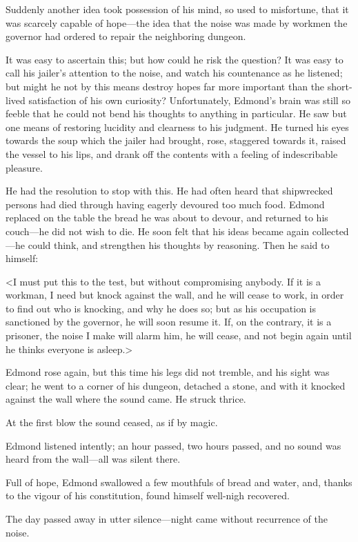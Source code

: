 Suddenly another idea took possession of his mind, so used to misfortune, that it was scarcely capable of hope—the idea that the noise was made by workmen the governor had ordered to repair the neighboring dungeon. 

 It was easy to ascertain this; but how could he risk the question? It was easy to call his jailer's attention to the noise, and watch his countenance as he listened; but might he not by this means destroy hopes far more important than the short-lived satisfaction of his own curiosity? Unfortunately, Edmond's brain was still so feeble that he could not bend his thoughts to anything in particular. He saw but one means of restoring lucidity and clearness to his judgment. He turned his eyes towards the soup which the jailer had brought, rose, staggered towards it, raised the vessel to his lips, and drank off the contents with a feeling of indescribable pleasure. 

 He had the resolution to stop with this. He had often heard that shipwrecked persons had died through having eagerly devoured too much food. Edmond replaced on the table the bread he was about to devour, and returned to his couch—he did not wish to die. He soon felt that his ideas became again collected—he could think, and strengthen his thoughts by reasoning. Then he said to himself: 

 <I must put this to the test, but without compromising anybody. If it is a workman, I need but knock against the wall, and he will cease to work, in order to find out who is knocking, and why he does so; but as his occupation is sanctioned by the governor, he will soon resume it. If, on the contrary, it is a prisoner, the noise I make will alarm him, he will cease, and not begin again until he thinks everyone is asleep.> 

 Edmond rose again, but this time his legs did not tremble, and his sight was clear; he went to a corner of his dungeon, detached a stone, and with it knocked against the wall where the sound came. He struck thrice. 

 At the first blow the sound ceased, as if by magic. 

 Edmond listened intently; an hour passed, two hours passed, and no sound was heard from the wall—all was silent there. 

 Full of hope, Edmond swallowed a few mouthfuls of bread and water, and, thanks to the vigour of his constitution, found himself well-nigh recovered. 

 The day passed away in utter silence—night came without recurrence of the noise. 

